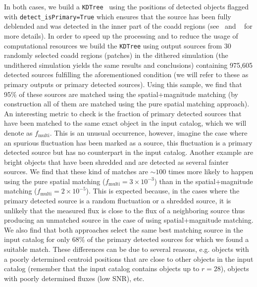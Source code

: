 \documentclass[twocolumn]{aastex62}
\begin{document}
In both cases, we build a \texttt{KDTree}~\citep{scikit-learn} using the positions of detected objects flagged with \texttt{detect\_isPrimary=True} which ensures that the source has been fully deblended and was detected in the inner part of the coadd regions (see~\citet{2018PASJ...70S...5B} and ~\citet{2018PASJ...70S..25M} for more details). In order to speed up the processing and to reduce the usage of computational resources we build the \texttt{KDTree} using output sources from 30 randomly selected coadd regions (patches) in the dithered simulation (the undithered simulation yields the same results and conclusions) containing 975,605 detected sources fulfilling the aforementioned condition (we will refer to these as primary outputs or primary detected sources). Using this sample, we find that 95\% of these sources are matched using the spatial+magnitude matching (by construction all of them are matched using the pure spatial matching approach). An interesting metric to check is the fraction of primary detected sources that have been matched to the same exact object in the input catalog, which we will denote as $f_{\mathrm{multi}}$. This is an unusual occurrence, however, imagine the case where an spurious fluctuation has been marked as a source, this fluctuation is a primary detected source but has no counterpart in the input catalog. Another example are bright objects that have been shredded and are detected as several fainter sources. We find that these kind of matches are $\sim 100$ times more likely to happen using the pure spatial matching ($f_{\mathrm{multi}} = 3 \times 10^{-3}$) than in the spatial+magnitude matching ($ f_{\mathrm{multi}} = 2 \times 10^{-5}$). This is expected because, in the cases where the primary detected source is a random fluctuation or a shredded source, it is unlikely that the measured flux is close to the flux of a neighboring source thus producing an unmatched source in the case of using spatial+magnitude matching. We also find that both approaches select the same best matching source in the input catalog for only 68\% of the primary detected sources for which we found a suitable match. These differences can be due to several reasons, e.g. objects with a poorly determined centroid positions that are close to other objects in the input catalog (remember that the input catalog contains objects up to $r=28$), objects with poorly determined fluxes (low SNR), etc.
\end{document}
